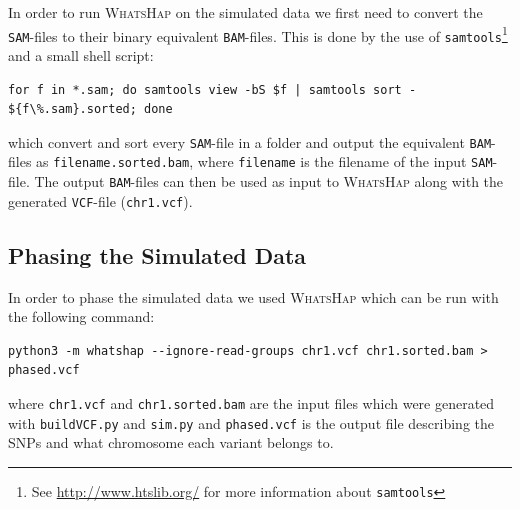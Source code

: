 \documentclass[10pt,a4paper]{article}
\begin{document}
In order to run \textsc{WhatsHap} on the simulated data we first need to convert the \texttt{SAM}-files to their binary equivalent \texttt{BAM}-files. This is done by the use of \texttt{samtools}\footnote{See \url{http://www.htslib.org/} for more information about \texttt{samtools}} and a small shell script:
\begin{lstlisting}
for f in *.sam; do samtools view -bS $f | samtools sort - ${f\%.sam}.sorted; done
\end{lstlisting}
which convert and sort every \texttt{SAM}-file in a folder and output the equivalent \texttt{BAM}-files as \texttt{filename.sorted.bam}, where \texttt{filename} is the filename of the input \texttt{SAM}-file. The output \texttt{BAM}-files can then be used as input to \textsc{WhatsHap} along with the generated \texttt{VCF}-file (\texttt{chr1.vcf}).

\subsection{Phasing the Simulated Data}
In order to phase the simulated data we used \textsc{WhatsHap} which can be run with the following command:
\begin{lstlisting}
python3 -m whatshap --ignore-read-groups chr1.vcf chr1.sorted.bam > phased.vcf
\end{lstlisting}
where \texttt{chr1.vcf} and \texttt{chr1.sorted.bam} are the input files which were generated with \texttt{buildVCF.py} and \texttt{sim.py} and \texttt{phased.vcf} is the output file describing the SNPs and what chromosome each variant belongs to.
\end{document}

